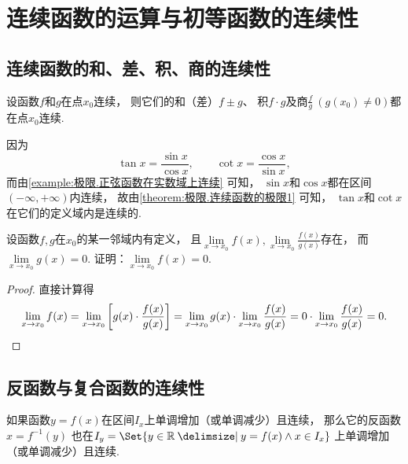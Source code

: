 \section{连续函数的运算与初等函数的连续性}
\subsection{连续函数的和、差、积、商的连续性}
\begin{theorem}\label{theorem:极限.连续函数的极限1}
设函数\(f\)和\(g\)在点\(x_0\)连续，
则它们的和（差）\(f \pm g\)、
积\(f \cdot g\)及商\(\frac{f}{g}\ (g(x_0)\neq0)\)都在点\(x_0\)连续.
\end{theorem}

\begin{example}
因为\[
	\tan x=\frac{\sin x}{\cos x}, \qquad
	\cot x=\frac{\cos x}{\sin x},
\]
而由\cref{example:极限.正弦函数在实数域上连续} 可知，
\(\sin x\)和\(\cos x\)都在区间\((-\infty,+\infty)\)内连续，
故由\cref{theorem:极限.连续函数的极限1} 可知，
\(\tan x\)和\(\cot x\)在它们的定义域内是连续的.
\end{example}

\begin{example}
设函数\(f,g\)在\(x_0\)的某一邻域内有定义，
且\(\lim\limits_{x\to x_0}f(x),
\lim\limits_{x\to x_0}\frac{f(x)}{g(x)}\)存在，
而\(\lim\limits_{x\to x_0}g(x)=0\).
证明：\(\lim\limits_{x\to x_0}f(x)=0\).
\begin{proof}
直接计算得\[
	\lim\limits_{x\to x_0}f(x)
	= \lim\limits_{x\to x_0}\left[
		g(x) \cdot \frac{f(x)}{g(x)}
	\right]
	= \lim\limits_{x\to x_0}g(x) \cdot \lim\limits_{x\to x_0}\frac{f(x)}{g(x)}
	= 0 \cdot \lim\limits_{x\to x_0}\frac{f(x)}{g(x)} = 0.
	\qedhere
\]
\end{proof}
\end{example}

\subsection{反函数与复合函数的连续性}
\begin{theorem}\label{theorem:极限.连续函数的极限2}
如果函数\(y = f(x)\)在区间\(I_x\)上单调增加（或单调减少）且连续，
那么它的反函数\(x = f^{-1}(y)\)
也在\(I_y = \Set{ y\in\mathbb{R} \given y = f(x) \land x \in I_x }\)
上单调增加（或单调减少）且连续.
\end{theorem}

